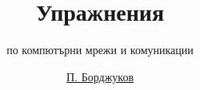 \documentclass{scrartcl}
\begin{document}
\title{Упражнения}
\subtitle{по компютърни мрежи и комуникации}
\author{\href{mailto:bordjukov@gmail.com}{П. Борджуков}}
\date{}

\maketitle


\end{document}
